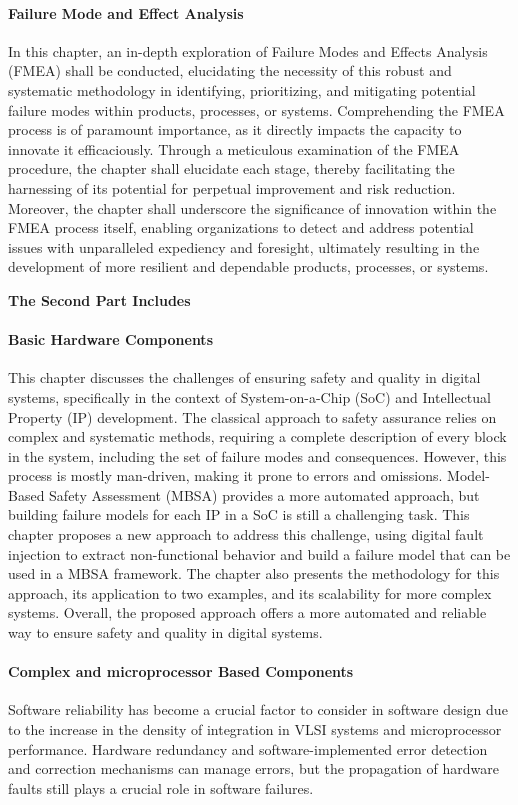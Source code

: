 \documentclass[./dissertation.tex]{subfiles}
\begin{document}
\paragraph{Failure Mode and Effect Analysis}
In this chapter, an in-depth exploration of Failure Modes and Effects Analysis (FMEA) shall be conducted, elucidating the necessity of this robust and systematic methodology in identifying, prioritizing, and mitigating potential failure modes within products, processes, or systems. Comprehending the FMEA process is of paramount importance, as it directly impacts the capacity to innovate it efficaciously. Through a meticulous examination of the FMEA procedure, the chapter shall elucidate each stage, thereby facilitating the harnessing of its potential for perpetual improvement and risk reduction. Moreover, the chapter shall underscore the significance of innovation within the FMEA process itself, enabling organizations to detect and address potential issues with unparalleled expediency and foresight, ultimately resulting in the development of more resilient and dependable products, processes, or systems.


\textbf{The Second Part Includes}
\paragraph{Basic Hardware Components}
This chapter discusses the challenges of ensuring safety and quality in digital systems, specifically in the context of System-on-a-Chip (SoC) and Intellectual Property (IP) development. The classical approach to safety assurance relies on complex and systematic methods, requiring a complete description of every block in the system, including the set of failure modes and consequences. However, this process is mostly man-driven, making it prone to errors and omissions. Model-Based Safety Assessment (MBSA) provides a more automated approach, but building failure models for each IP in a SoC is still a challenging task. This chapter proposes a new approach to address this challenge, using digital fault injection to extract non-functional behavior and build a failure model that can be used in a MBSA framework. The chapter also presents the methodology for this approach, its application to two examples, and its scalability for more complex systems. Overall, the proposed approach offers a more automated and reliable way to ensure safety and quality in digital systems.
\paragraph{Complex and microprocessor Based Components}
Software reliability has become a crucial factor to consider in software design due to the increase in the density of integration in VLSI systems and microprocessor performance. Hardware redundancy and software-implemented error detection and correction mechanisms can manage errors, but the propagation of hardware faults still plays a crucial role in software failures.
\end{document}
